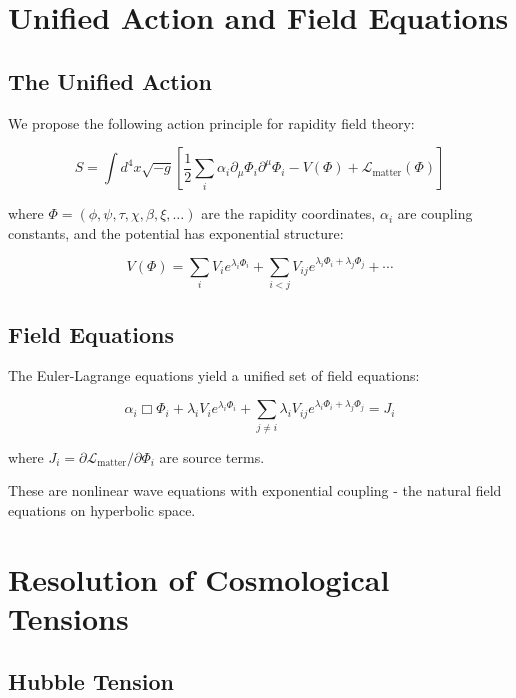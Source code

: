 \documentclass[12pt,a4paper]{article}
\begin{document}
\section{Unified Action and Field Equations}

\subsection{The Unified Action}

We propose the following action principle for rapidity field theory:

\begin{equation}
S = \int d^4x \sqrt{-g} \left[ \frac{1}{2} \sum_i \alpha_i \partial_\mu \Phi_i \partial^\mu \Phi_i - V(\Phi) + \mathcal{L}_{\text{matter}}(\Phi) \right]
\end{equation}

where $\Phi = (\phi, \psi, \tau, \chi, \beta, \xi, \ldots)$ are the rapidity coordinates, $\alpha_i$ are coupling constants, and the potential has exponential structure:

\begin{equation}
V(\Phi) = \sum_i V_i e^{\lambda_i \Phi_i} + \sum_{i<j} V_{ij} e^{\lambda_i \Phi_i + \lambda_j \Phi_j} + \cdots
\end{equation}

\subsection{Field Equations}

The Euler-Lagrange equations yield a unified set of field equations:

\begin{equation}
\alpha_i \Box \Phi_i + \lambda_i V_i e^{\lambda_i \Phi_i} + \sum_{j \neq i} \lambda_i V_{ij} e^{\lambda_i \Phi_i + \lambda_j \Phi_j} = J_i
\end{equation}

where $J_i = \partial \mathcal{L}_{\text{matter}}/\partial \Phi_i$ are source terms.

These are nonlinear wave equations with exponential coupling - the natural field equations on hyperbolic space.

\section{Resolution of Cosmological Tensions}

\subsection{Hubble Tension}
\end{document}
